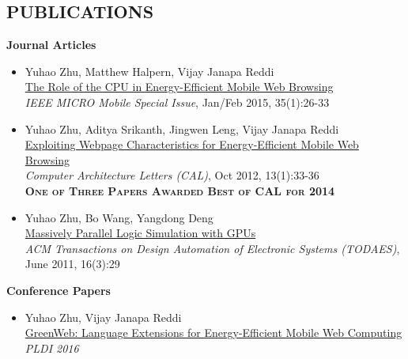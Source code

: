 \documentclass[margin, 9pt]{res} %
\begin{document}
\begin{resume}
 
\section{PUBLICATIONS}

{\large\textbf{Journal Articles}}

\begin{itemize}[leftmargin=*] \itemsep 0pt
	\item Yuhao Zhu, Matthew Halpern, Vijay Janapa Reddi\\[2pt]
          \href{http://yuhaozhu.com/pubs/ieeemicro15.pdf}{The Role of the CPU in Energy-Efficient Mobile Web Browsing}\\
          \textit{IEEE MICRO Mobile Special Issue}, Jan/Feb 2015, 35(1):26-33

	\item Yuhao Zhu, Aditya Srikanth, Jingwen Leng, Vijay Janapa Reddi\\[2pt]
          \href{http://yuhaozhu.com/pubs/cal12.pdf}{Exploiting Webpage Characteristics for Energy-Efficient Mobile Web Browsing}\\
          \textit{Computer Architecture Letters (CAL)}, Oct 2012, 13(1):33-36\\
          \textbf{\textsc{One of Three Papers Awarded Best of CAL for 2014}}

	\item Yuhao Zhu, Bo Wang, Yangdong Deng\\[2pt]
          \href{http://yuhaozhu.com/pubs/todaes11.pdf}{Massively Parallel Logic Simulation with GPUs}\\
          \textit{ACM Transactions on Design Automation of Electronic Systems (TODAES)}, June 2011, 16(3):29
\end{itemize}

\vspace*{7pt}
{\large\textbf{Conference Papers}}

\begin{itemize}[leftmargin=*] \itemsep 0pt
	\item Yuhao Zhu, Vijay Janapa Reddi\\[2pt]
          {\href{http://yuhaozhu.com/pubs/pldi16.pdf}{GreenWeb: Language Extensions for Energy-Efficient Mobile Web Computing}}\\
          \textit{PLDI 2016}


\end{itemize}
\end{resume}
\end{document}
